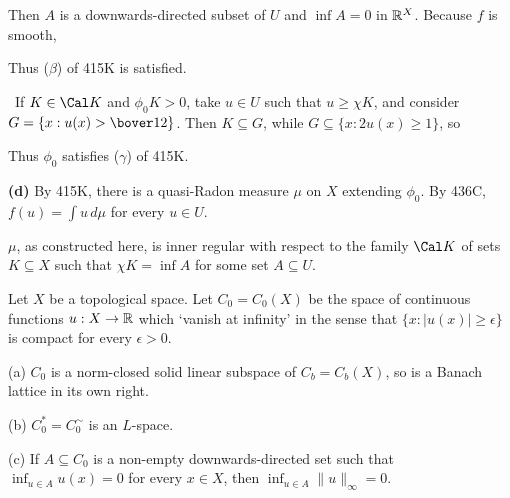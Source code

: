 {\noindent Then $A$ is a downwards-directed subset of $U$ and $\inf A=0$ 
in $\Bbb R^X$.   Because $f$ is smooth, 
      
      
\noindent Thus ($\beta$) of 415K is satisfied. 
      
\medskip 
      
\quad\grheadc\ If $K\in\Cal K$ and $\phi_0K>0$, take $u\in U$ such that 
$u\ge\chi K$, and consider $G=\{x:u(x)>\bover12\}$.   Then 
$K\subseteq G$, while $G\subseteq\{x:2u(x)\ge 1\}$, so 
      
      
\noindent Thus $\phi_0$ satisfies ($\gamma$) of 415K.\ \Qed 
      
\medskip 
      
{\bf (d)} By 415K, there is a quasi-Radon measure $\mu$ on $X$ extending 
$\phi_0$.   By 436C, $f(u)=\int u\,d\mu$ for every $u\in U$. 
}%
      
\medskip 
      
 $\mu$, as 
constructed here, is inner regular with respect to the family $\Cal K$ 
of sets 
$K\subseteq X$ such that $\chi K=\inf A$ for some set $A\subseteq U$. 
      
 Let $X$ be a topological space.   Let $C_0=C_0(X)$ 
be the space of continuous functions $u:X\to\Bbb R$ which `vanish at 
infinity' in the sense that $\{x:|u(x)|\ge\epsilon\}$ is compact for 
every $\epsilon>0$. 
      
(a) $C_0$ is a norm-closed solid linear subspace of $C_b=C_b(X)$, so is 
a Banach lattice in its own right. 
      
(b) $C_0^*=C_0^{\sim}$ is an $L$-space. 
      
(c) If $A\subseteq C_0$ is a non-empty downwards-directed set such 
that $\inf_{u\in A}u(x)=0$ for every $x\in X$, then 
$\inf_{u\in A}\|u\|_{\infty}=0$. 
      

